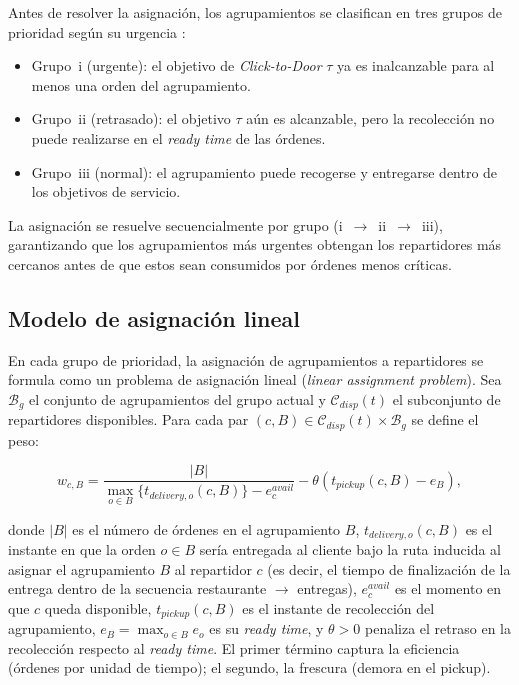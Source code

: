 \documentclass[12pt,letterpaper,oneside]{book}
\begin{document}
	Antes de resolver la asignación, los agrupamientos se clasifican en tres
	grupos de prioridad según su urgencia \citep{Reyes2018}:

	\begin{itemize}
		\item Grupo~i (urgente): el objetivo de \textit{Click-to-Door} $\tau$ ya
		      es inalcanzable para al menos una orden del agrupamiento.
		\item Grupo~ii (retrasado): el objetivo $\tau$ aún es alcanzable,
		      pero la recolección no puede realizarse en el \textit{ready time}
		      de las órdenes.
		\item Grupo~iii (normal): el agrupamiento puede recogerse y
		      entregarse dentro de los objetivos de servicio.
	\end{itemize}

	La asignación se resuelve secuencialmente por grupo
	(i~$\to$~ii~$\to$~iii), garantizando que los agrupamientos más urgentes
	obtengan los repartidores más cercanos antes de que estos sean consumidos por
	órdenes menos críticas.

	\subsection{Modelo de asignación lineal}

	En cada grupo de prioridad, la asignación de agrupamientos a repartidores se
	formula como un problema de asignación lineal (\textit{linear
	assignment problem}).  Sea $\mathcal{B}_g$ el conjunto de agrupamientos del grupo actual y
	$\mathcal{C}_{disp}(t)$ el subconjunto de repartidores disponibles.  Para cada
	par $(c, B) \in \mathcal{C}_{disp}(t) \times \mathcal{B}_g$ se define el peso:

	\begin{equation}
		w_{c,B} = \frac{|B|}{\max_{o \in B}\{t_{delivery,o}(c,B)\} - e^{avail}_c}
		        - \theta\!\left(t_{pickup}(c,B) - e_B\right),
		\label{eq:matching_theory}
	\end{equation}

	\noindent donde $|B|$ es el número de órdenes en el agrupamiento $B$,
	$t_{delivery,o}(c,B)$ es el instante en que la orden $o \in B$ sería
	entregada al cliente bajo la ruta inducida al asignar el agrupamiento
	$B$ al repartidor $c$ (es decir, el tiempo de finalización de la entrega
	dentro de la secuencia restaurante $\to$ entregas), $e^{avail}_c$ es el
	momento en que $c$ queda disponible,
	$t_{pickup}(c,B)$ es el instante de recolección del agrupamiento,
	$e_B = \max_{o \in B} e_o$ es su \textit{ready time}, y $\theta > 0$
	penaliza el retraso en la recolección respecto al \textit{ready time}.
	El primer término captura la eficiencia (órdenes por unidad de
	tiempo); el segundo, la frescura (demora en el pickup).
\end{document}
